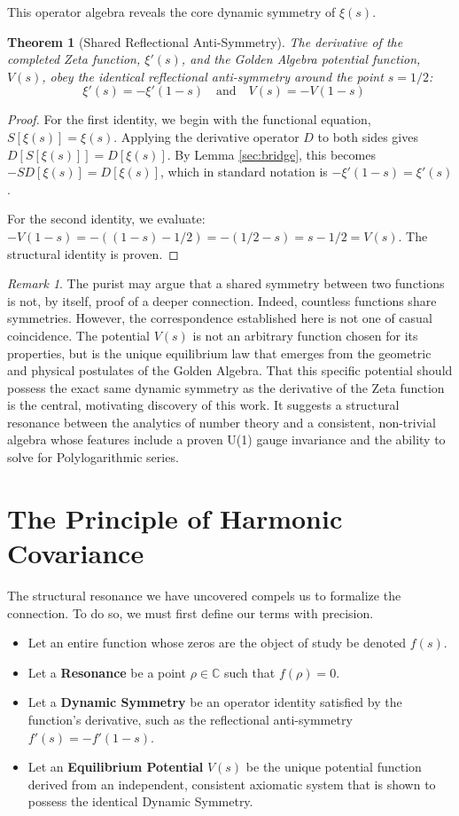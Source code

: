 \documentclass{article}
\theoremstyle{plain}
\newtheorem{theorem}{Theorem}[section]
\theoremstyle{definition}
\theoremstyle{remark}
\newtheorem*{remark}{Remark}
\begin{document}
This operator algebra reveals the core dynamic symmetry of $\xi(s)$.

\begin{theorem}[Shared Reflectional Anti-Symmetry]
The derivative of the completed Zeta function, $\xi'(s)$, and the Golden Algebra potential function, $V(s)$, obey the identical reflectional anti-symmetry around the point $s=1/2$:
$$ \xi'(s) = -\xi'(1-s) \quad \text{and} \quad V(s) = -V(1-s) \quad \text{}$$
\end{theorem}
\begin{proof}
For the first identity, we begin with the functional equation, $S[\xi(s)] = \xi(s)$. Applying the derivative operator $D$ to both sides gives $D[S[\xi(s)]] = D[\xi(s)]$. By Lemma \ref{sec:bridge}, this becomes $-SD[\xi(s)] = D[\xi(s)]$, which in standard notation is $-\xi'(1-s) = \xi'(s)$.

For the second identity, we evaluate: $-V(1-s) = -((1-s) - 1/2) = -(1/2 - s) = s - 1/2 = V(s)$. The structural identity is proven.
\end{proof}

\begin{remark}
The purist may argue that a shared symmetry between two functions is not, by itself, proof of a deeper connection. Indeed, countless functions share symmetries. However, the correspondence established here is not one of casual coincidence. The potential $V(s)$ is not an arbitrary function chosen for its properties, but is the unique equilibrium law that emerges from the geometric and physical postulates of the Golden Algebra. That this specific potential should possess the exact same dynamic symmetry as the derivative of the Zeta function is the central, motivating discovery of this work. It suggests a structural resonance between the analytics of number theory and a consistent, non-trivial algebra whose features include a proven U(1) gauge invariance and the ability to solve for Polylogarithmic series.
\end{remark}


\section{The Principle of Harmonic Covariance}
\label{sec:covariance}

The structural resonance we have uncovered compels us to formalize the connection. To do so, we must first define our terms with precision.

\begin{itemize}
    \item Let an entire function whose zeros are the object of study be denoted $f(s)$.
    \item Let a \textbf{Resonance} be a point $\rho \in \mathbb{C}$ such that $f(\rho)=0$.
    \item Let a \textbf{Dynamic Symmetry} be an operator identity satisfied by the function's derivative, such as the reflectional anti-symmetry $f'(s) = -f'(1-s)$.
    \item Let an \textbf{Equilibrium Potential} $V(s)$ be the unique potential function derived from an independent, consistent axiomatic system that is shown to possess the identical Dynamic Symmetry.
\end{itemize}
\end{document}
